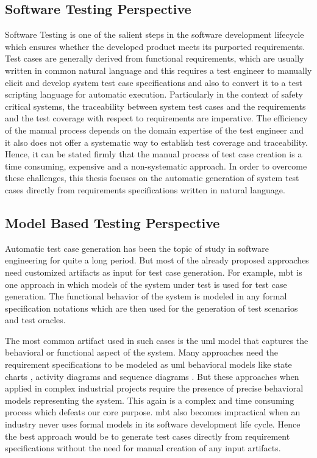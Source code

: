 \subsection{Software Testing Perspective}
Software Testing is one of the salient steps in the software development lifecycle which ensures whether the developed product meets its purported requirements. Test cases are generally derived from functional requirements, which are usually written in common natural language and this requires a test engineer to manually elicit and develop system test case specifications and also to convert it to a test scripting language for automatic execution. Particularly in the context of safety critical systems, the traceability between system test cases and the requirements and the test coverage with respect to requirements are imperative. The efficiency of the manual process depends on the domain expertise of the test engineer and  it also does not offer a systematic way to establish test coverage and traceability. Hence, it can be stated firmly that the manual process of test case creation is a time consuming, expensive and a non-systematic approach. In order to overcome these challenges, this thesis focuses on the automatic generation of system test cases directly from requirements specifications written in natural language.

\subsection{Model Based Testing Perspective}
Automatic test case generation has been the topic of study in software engineering for quite a long period. But most of the already proposed approaches need customized artifacts as input for test case generation. For example, \gls{mbt} is one approach in which models of the system under test is used for test case generation.  The functional behavior of the system is modeled in any formal specification notations \cite{carvalho2013test} which are then used for the generation of test scenarios and test oracles.

The most common artifact used in such cases is the \gls{uml} model that captures the behavioral or functional aspect of the system. Many approaches need the requirement specifications to be modeled as \gls{uml} behavioral models like state charts \cite{ryser1999scenario}, activity diagrams \cite{linzhang2004generating} and sequence diagrams \cite{nebut2006automatic}.  But these approaches when applied in complex industrial projects require the presence of precise behavioral models representing the system. This again is a complex and time consuming process which defeats our core purpose. \gls{mbt} also becomes impractical when an industry never uses formal models in its software development life cycle.  Hence the best approach would be to generate test cases directly from requirement specifications without the need for manual creation of any input artifacts.
